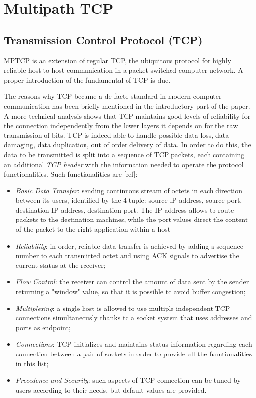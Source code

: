 \chapter{Multipath TCP}
\label{chap:multipathtcp}

\section{Transmission Control Protocol (TCP)}
MPTCP is an extension of regular TCP, the ubiquitous protocol for highly reliable host-to-host communication in a packet-switched computer network. A proper introduction of the fundamental of TCP is due.


The reasons why TCP became a de-facto standard in modern computer communication has been briefly mentioned in the introductory part of the paper. A more technical analysis shows that TCP maintains good levels of reliability for the connection independently from the lower layers it depends on for the raw transmission of bits. TCP is indeed able to handle possible data loss, data damaging, data duplication, out of order delivery of data. In order to do this, the data to be transmitted is split into a sequence of TCP packets, each containing an additional \textit{TCP header} with the information needed to operate the protocol functionalities. Such functionalities are [\href{https://tools.ietf.org/html/rfc793}{ref}]:

\begin{itemize}
  \item \textit{Basic Data Transfer}: sending continuous stream of octets in each direction between its users, identified by the 4-tuple: source IP address, source port, destination IP address, destination port. The IP address allows to route packets to the destination machines, while the port values direct the content of the packet to the right application within a host;
  \item \textit{Reliability}: in-order, reliable data transfer is achieved by adding a sequence number to each transmitted octet and using ACK signals to advertise the current status at the receiver;
  \item \textit{Flow Control}: the receiver can control the amount of data sent by the sender returning a "window" value, so that it is possible to avoid buffer congestion;
  \item \textit{Multiplexing}: a single host is allowed to use multiple independent TCP connections simultaneously thanks to a socket system that uses addresses and ports as endpoint;
  \item \textit{Connections}: TCP initializes and maintains status information regarding each connection between a pair of sockets in order to provide all the functionalities in this list;
  \item \textit{Precedence and Security}: such aspects of TCP connection can be tuned by users according to their needs, but default values are provided.
\end{itemize}

